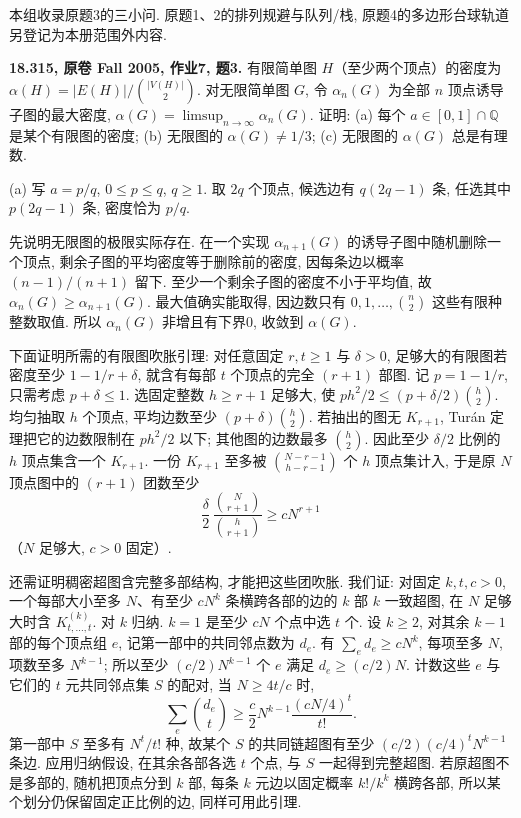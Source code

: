 本组收录原题3的三小问. 原题1、2的排列规避与队列/栈,
原题4的多边形台球轨道另登记为本册范围外内容.

\begin{exercise}\label{mit:18315-hw7-q3}
\textbf{18.315, 原卷 Fall 2005, 作业7, 题3.}
有限简单图 $H$（至少两个顶点）的密度为
$\alpha(H)=|E(H)|/\binom{|V(H)|}{2}$.
对无限简单图 $G$, 令 $\alpha_n(G)$ 为全部 $n$ 顶点诱导子图的最大密度,
$\alpha(G)=\limsup_{n\to\infty}\alpha_n(G)$.
证明: (a) 每个 $a\in[0,1]\cap\mathbb Q$ 是某个有限图的密度;
(b) 无限图的 $\alpha(G)\ne1/3$; (c) 无限图的 $\alpha(G)$ 总是有理数.
\end{exercise}
\begin{solution}
(a) 写 $a=p/q$, $0\le p\le q$, $q\ge1$.
取 $2q$ 个顶点, 候选边有 $q(2q-1)$ 条,
任选其中 $p(2q-1)$ 条, 密度恰为 $p/q$.

先说明无限图的极限实际存在. 在一个实现 $\alpha_{n+1}(G)$ 的诱导子图中随机删除一个顶点,
剩余子图的平均密度等于删除前的密度, 因每条边以概率 $(n-1)/(n+1)$ 留下.
至少一个剩余子图的密度不小于平均值, 故 $\alpha_n(G)\ge\alpha_{n+1}(G)$.
最大值确实能取得, 因边数只有 $0,1,\ldots,\binom n2$ 这些有限种整数取值.
所以 $\alpha_n(G)$ 非增且有下界0, 收敛到 $\alpha(G)$.

下面证明所需的有限图吹胀引理:
对任意固定 $r,t\ge1$ 与 $\delta>0$,
足够大的有限图若密度至少 $1-1/r+\delta$,
就含有每部 $t$ 个顶点的完全 $(r+1)$ 部图.
记 $p=1-1/r$, 只需考虑 $p+\delta\le1$.
选固定整数 $h\ge r+1$ 足够大, 使
$p h^2/2\le(p+\delta/2)\binom h2$.
均匀抽取 $h$ 个顶点, 平均边数至少 $(p+\delta)\binom h2$.
若抽出的图无 $K_{r+1}$, Turán 定理把它的边数限制在 $ph^2/2$ 以下;
其他图的边数最多 $\binom h2$.
因此至少 $\delta/2$ 比例的 $h$ 顶点集含一个 $K_{r+1}$.
一份 $K_{r+1}$ 至多被 $\binom{N-r-1}{h-r-1}$ 个 $h$ 顶点集计入,
于是原 $N$ 顶点图中的 $(r+1)$ 团数至少
\[
\frac{\delta}{2}\,
\frac{\binom N{r+1}}{\binom h{r+1}}
\ge cN^{r+1}
\]
（$N$ 足够大, $c>0$ 固定）.

还需证明稠密超图含完整多部结构, 才能把这些团吹胀.
我们证: 对固定 $k,t,c>0$, 一个每部大小至多 $N$、有至少 $cN^k$ 条横跨各部的边的
$k$ 部 $k$ 一致超图, 在 $N$ 足够大时含 $K^{(k)}_{t,\ldots,t}$.
对 $k$ 归纳. $k=1$ 是至少 $cN$ 个点中选 $t$ 个.
设 $k\ge2$, 对其余 $k-1$ 部的每个顶点组 $e$, 记第一部中的共同邻点数为 $d_e$.
有 $\sum_e d_e\ge cN^k$, 每项至多 $N$, 项数至多 $N^{k-1}$;
所以至少 $(c/2)N^{k-1}$ 个 $e$ 满足 $d_e\ge(c/2)N$.
计数这些 $e$ 与它们的 $t$ 元共同邻点集 $S$ 的配对, 当 $N\ge4t/c$ 时,
\[
\sum_e\binom{d_e}{t}
\ge\frac c2 N^{k-1}\frac{(cN/4)^t}{t!}.
\]
第一部中 $S$ 至多有 $N^t/t!$ 种,
故某个 $S$ 的共同链超图有至少
$(c/2)(c/4)^tN^{k-1}$ 条边.
应用归纳假设, 在其余各部各选 $t$ 个点, 与 $S$ 一起得到完整超图.
若原超图不是多部的, 随机把顶点分到 $k$ 部,
每条 $k$ 元边以固定概率 $k!/k^k$ 横跨各部,
所以某个划分仍保留固定正比例的边, 同样可用此引理.


\end{solution}
